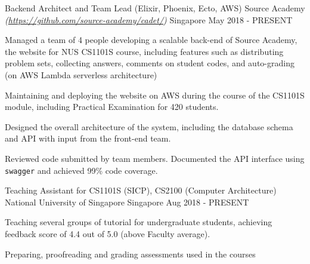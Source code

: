 \begin{cventries}
  \cventry
  {Backend Architect and Team Lead (Elixir, Phoenix, Ecto, AWS)} %
  {Source Academy \textmd{\em\tiny(\url{https://github.com/source-academy/cadet/})}} %
  {Singapore} %
  {May 2018 - PRESENT} %
  {
    \begin{cvitems}
      \item {Managed a team of 4 people developing a scalable back-end of Source Academy, the website for NUS CS1101S course, including features such as distributing problem sets, collecting answers, comments on student codes, and auto-grading (on AWS Lambda serverless architecture)}
      \item {Maintaining and deploying the website on AWS during the course of the CS1101S module, including Practical Examination for 420 students.}
      \item {Designed the overall architecture of the system, including the database schema and API with input from the front-end team.}
      \item {Reviewed code submitted by team members. Documented the API interface using \texttt{swagger} and achieved 99\% code coverage.}
    \end{cvitems}
  }
  \cventry
  {Teaching Assistant for CS1101S (SICP), CS2100 (Computer Architecture)} %
  {National University of Singapore} %
  {Singapore} %
  {Aug 2018 - PRESENT} %
  {
    \begin{cvitems}
    \item {Teaching several groups of tutorial for undergraduate students, achieving feedback score of 4.4 out of 5.0 (above Faculty average).}
      \item {Preparing, proofreading and grading assessments used in the courses}
    \end{cvitems}
  }

\end{cventries}
